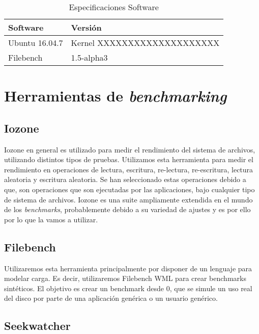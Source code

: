 \begin{table}
    \centering
    \begin{tabular}{|l|l|}
    \hline
        Software & Versión \\ \hline\hline
        Ubuntu 16.04.7 & Kernel XXXXXXXXXXXXXXXXXXXX \\ \hline
        Filebench & 1.5-alpha3 \\ \hline
    \end{tabular}
    \caption{Especificaciones Software}
\label{table:2}
\end{table}

\section{Herramientas de \textit{benchmarking}}
\subsection{Iozone}
Iozone en general es utilizado para medir el rendimiento del sistema de archivos, utilizando distintos tipos de pruebas. Utilizamos esta herramienta para medir el rendimiento en operaciones de lectura, escritura, re-lectura, re-escritura, lectura aleatoria y escritura aleatoria. Se han seleccionado estas operaciones debido a que, son operaciones que son ejecutadas por las aplicaciones, bajo cualquier tipo de sistema de archivos. Iozone es una suite ampliamente extendida en el mundo de los \textit{benchmarks}, probablemente debido a su variedad de ajustes y es por ello por lo que la vamos a utilizar.
\subsection{Filebench}
Utilizaremos esta herramienta principalmente por disponer de un lenguaje para modelar carga. Es decir, utilizaremos Filebench WML para crear benchmarks sintéticos. El objetivo es crear un benchmark desde 0, que se simule un uso real del disco por parte de una aplicación genérica o un usuario genérico. 
\subsection{Seekwatcher}
\begin{lstlisting}[language=bash]
\end{lstlisting}
